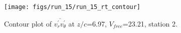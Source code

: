 \begin{figure}[H]
\centering
\texttt{[image: figs/run\_15/run\_15\_rt\_contour]}
\caption{Contour plot of $\overline{v_{r}^{\prime} v_{\theta}^{\prime}}$ at $z/c$=6.97, $V_{free}$=23.21, station 2.}
\label{fig:run_15_rt_contour}
\end{figure}


